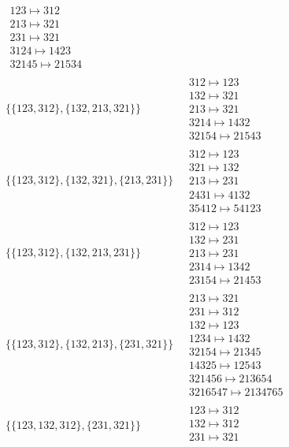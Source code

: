 \begin{scriptsize}
\begin{align}
\begin{matrix}
123 \mapsto 312
\\
213 \mapsto 321
\\
231 \mapsto 321
\\
3124 \mapsto 1423
\\
32145 \mapsto 21534
\end{matrix}
\\
\{\{123, 312\}, \{132, 213, 321\}\}
\ 
&
\begin{matrix}
312 \mapsto 123
\\
132 \mapsto 321
\\
213 \mapsto 321
\\
3214 \mapsto 1432
\\
32154 \mapsto 21543
\end{matrix}
\\
\{\{123, 312\}, \{132, 321\}, \{213, 231\}\}
\ 
&
\begin{matrix}
312 \mapsto 123
\\
321 \mapsto 132
\\
213 \mapsto 231
\\
2431 \mapsto 4132
\\
35412 \mapsto 54123
\end{matrix}
\\
\{\{123, 312\}, \{132, 213, 231\}\}
\ 
&
\begin{matrix}
312 \mapsto 123
\\
132 \mapsto 231
\\
213 \mapsto 231
\\
2314 \mapsto 1342
\\
23154 \mapsto 21453
\end{matrix}
\\
\{\{123, 312\}, \{132, 213\}, \{231, 321\}\}
\ 
&
\begin{matrix}
213 \mapsto 321
\\
231 \mapsto 312
\\
132 \mapsto 123
\\
1234 \mapsto 1432
\\
32154 \mapsto 21345
\\
14325 \mapsto 12543
\\
321456 \mapsto 213654
\\
3216547 \mapsto 2134765
\end{matrix}
\\
\{\{123, 132, 312\}, \{231, 321\}\}
\ 
&
\begin{matrix}
123 \mapsto 312
\\
132 \mapsto 312
\\
231 \mapsto 321
\\

\end{matrix}
\end{align}
\end{scriptsize}
